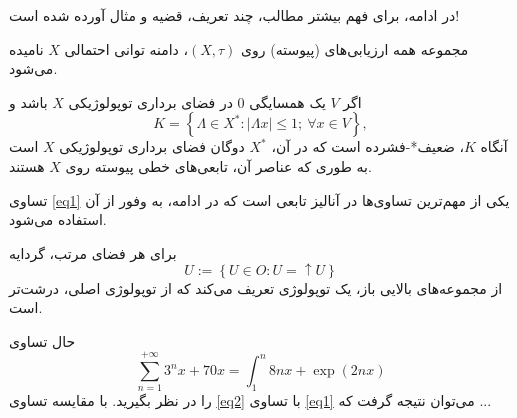 در ادامه، برای فهم بیشتر مطالب، چند تعریف، قضیه و مثال آورده شده است!
\begin{definition}
مجموعه همه ارزیابی‌های  (پیوسته)  روی $(X,\tau)$، دامنه توانی احتمالی
$ X $
نامیده می‌شود.
\end{definition}
\begin{theorem}
اگر $ V $ یک همسایگی $ 0 $ در فضای برداری 
 توپولوژیکی $ X $ باشد و 
\begin{equation}\label{eq1}
K=\left\lbrace \Lambda \in X^{*}:|\Lambda x|\leqslant 1 ; \ \forall x\in V\right\rbrace,
\end{equation}
آنگاه $ K $،  ضعیف*-فشرده است که در آن، $ X^{*} $ دوگان
 فضای برداری توپولوژیکی $ X $ است به ‌طوری که عناصر آن،  تابعی‌های 
خطی پیوسته
 روی $X$ هستند.
\end{theorem}
تساوی \eqref{eq1} یکی از مهم‌ترین تساوی‌ها در آنالیز تابعی است که در ادامه، به وفور از آن استفاده می‌شود.
\begin{example}
برای هر فضای مرتب، گردایه 
$$U:=\left\lbrace U\in O: U=\uparrow U\right\rbrace $$
از مجموعه‌های بالایی باز، یک توپولوژی تعریف می‌کند که از توپولوژی اصلی، درشت‌تر  است.
\end{example}
حال تساوی 
\begin{equation}\label{eq2}
\sum_{n=1}^{+\infty} 3^{n}x+70x=\int_{1}^{n}8nx+\exp{(2nx)}
\end{equation}
را در نظر بگیرید. با مقایسه تساوی \eqref{eq2} با تساوی \eqref{eq1} می‌توان نتیجه گرفت که ...